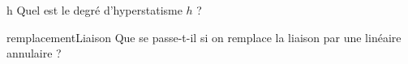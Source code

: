 \documentclass[10pt]{article}
\begin{document}
{%
\begin{question}{h}
Quel est le degré d'hyperstatisme $h$ ?
\begin{reponseshoriz}
	\mauvaise{$\pi$}
\end{reponseshoriz}
\end{question}

\begin{question}{remplacementLiaison}
Que se passe-t-il si on remplace la liaison  par une linéaire annulaire ?
\begin{multicols}{2}
\begin{reponses}
\end{reponses}
\end{multicols}
\end{question}
}
\end{document}
